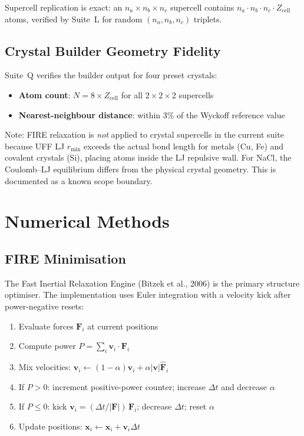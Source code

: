 \documentclass[11pt,twoside]{article}
\newcommand{\rmin}{r_{\mathrm{min}}}
\begin{document}
Supercell replication is exact: an $n_a \times n_b \times n_c$ supercell
contains $n_a \cdot n_b \cdot n_c \cdot Z_{\mathrm{cell}}$ atoms, verified
by Suite~L for random $(n_a, n_b, n_c)$ triplets.

\subsection{Crystal Builder Geometry Fidelity}

Suite~Q verifies the builder output for four preset crystals:
\begin{itemize}
  \item \textbf{Atom count}: $N = 8 \times Z_{\mathrm{cell}}$ for all
        $2 \times 2 \times 2$ supercells
  \item \textbf{Nearest-neighbour distance}: within 3\% of the Wyckoff
        reference value
\end{itemize}

Note: FIRE relaxation is \emph{not} applied to crystal supercells in the
current suite because UFF LJ $\rmin$ exceeds the actual bond length for
metals (Cu, Fe) and covalent crystals (Si), placing atoms inside the LJ
repulsive wall.  For NaCl, the Coulomb--LJ equilibrium differs from the
physical crystal geometry.  This is documented as a known scope boundary.


\section{Numerical Methods}
\label{sec:numerical}

\subsection{FIRE Minimisation}

The Fast Inertial Relaxation Engine (Bitzek et al., 2006) is the primary
structure optimiser.  The implementation uses Euler integration with a
velocity kick after power-negative resets:

\begin{enumerate}
  \item Evaluate forces $\mathbf{F}_i$ at current positions
  \item Compute power $P = \sum_i \mathbf{v}_i \cdot \mathbf{F}_i$
  \item Mix velocities: $\mathbf{v}_i \leftarrow (1-\alpha)\mathbf{v}_i +
        \alpha |\mathbf{v}| \hat{\mathbf{F}}_i$
  \item If $P > 0$: increment positive-power counter; increase
        $\Delta t$ and decrease $\alpha$
  \item If $P \leq 0$: kick $\mathbf{v}_i = (\Delta t / |\mathbf{F}|)\,
        \mathbf{F}_i$; decrease $\Delta t$; reset $\alpha$
  \item Update positions: $\mathbf{x}_i \leftarrow \mathbf{x}_i +
        \mathbf{v}_i \Delta t$
\end{enumerate}
\end{document}
